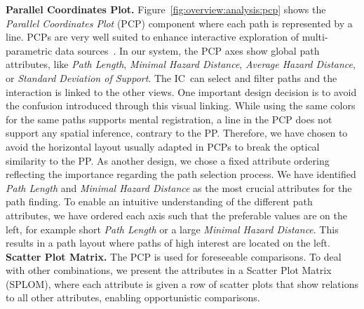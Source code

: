 \documentclass[conference,10pt,letter]{IEEEtran}
\def\IC{IC}
\begin{document}
%
\noindent \textbf{Parallel Coordinates Plot.} Figure~\ref{fig:overview:analysis:pcp} shows the \emph{Parallel Coordinates Plot} (PCP) component where each path is represented by a line. PCPs are very well suited to enhance interactive exploration of multi-parametric data sources~\cite{Tory05aparallel}. In our system, the PCP axes show global path attributes, like \emph{Path Length}, \emph{Minimal Hazard Distance}, \emph{Average Hazard Distance}, or \emph{Standard Deviation of Support}. The \IC\ can select and filter paths and the interaction is linked to the other views. One important design decision is to avoid the confusion introduced through this visual linking. While using the same colors for the same paths supports mental registration, a line in the PCP does not support any spatial inference, contrary to the PP. Therefore, we have chosen to avoid the horizontal layout usually adapted in PCPs to break the optical similarity to the PP. As another design, we chose a fixed attribute ordering reflecting the importance regarding the path selection process. We have identified \emph{Path Length} and \emph{Minimal Hazard Distance} as the most crucial attributes for the path finding. To enable an intuitive understanding of the different path attributes, we have ordered each axis such that the preferable values are on the left, for example short \emph{Path Length} or a large \emph{Minimal Hazard Distance}. This results in a path layout where paths of high interest are located on the left. \\
%
\noindent \textbf{Scatter Plot Matrix.} The PCP is used for foreseeable comparisons. To deal with other combinations, we present the attributes in a Scatter Plot Matrix (SPLOM), where each attribute is given a row of scatter plots that show relations to all other attributes, enabling opportunistic comparisons.
\end{document}
